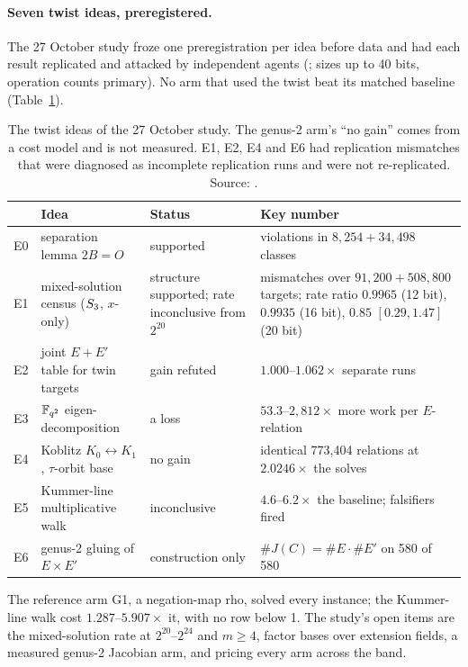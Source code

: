 \paragraph{Seven twist ideas, preregistered.} The 27 October study froze
one preregistration per idea before data and had each result replicated
and attacked by independent agents (;
sizes up to 40 bits, operation counts primary). No arm that used the twist
beat its matched baseline (Table~\ref{tab:tp-twist}).

\begin{table}[t]
\centering\small
\begin{tabularx}{\linewidth}{@{}l>{\raggedright}p{3.6cm}>{\raggedright}p{2.6cm}>{\raggedright\arraybackslash}X@{}}
\toprule
& Idea & Status & Key number \\
\midrule
E0 & separation lemma $2B=O$ & supported & 0 violations in $8{,}254+34{,}498$ classes \\
E1 & mixed-solution census ($S_{3}$, $x$-only) & structure supported; rate inconclusive from $2^{20}$ & 0 mismatches over $91{,}200+508{,}800$ targets; rate ratio $0.9965$ (12 bit), $0.9935$ (16 bit), $0.85$ $[0.29,1.47]$ (20 bit) \\
E2 & joint $E+E'$ table for twin targets & gain refuted & $1.000$--$1.062\times$ separate runs \\
E3 & $\mathbb{F}_{q^2}$ eigen-decomposition & a loss & $53.3$--$2{,}812\times$ more work per $E$-relation \\
E4 & Koblitz $K_0\leftrightarrow K_1$, $\tau$-orbit base & no gain & identical 773{,}404 relations at $2.0246\times$ the solves \\
E5 & Kummer-line multiplicative walk & inconclusive & $4.6$--$6.2\times$ the baseline; falsifiers fired \\
E6 & genus-2 gluing of $E\times E'$ & construction only & $\#J(C)=\#E\cdot\#E'$ on 580 of 580 \\
\bottomrule
\end{tabularx}
\caption[]{The twist ideas of the 27 October study. The genus-2 arm's ``no
gain'' comes from a cost model and is not measured. E1, E2, E4 and E6 had
replication mismatches that were diagnosed as incomplete replication runs
and were not re-replicated. Source: .}
\label{tab:tp-twist}
\end{table}

The reference arm G1, a negation-map rho, solved every instance; the
Kummer-line walk cost $1.287$--$5.907\times$ it, with no row below 1. The
study's open items are the mixed-solution rate at $2^{20}$--$2^{24}$ and
$m\ge4$, factor bases over extension fields, a measured genus-2 Jacobian
arm, and pricing every arm across the band.

